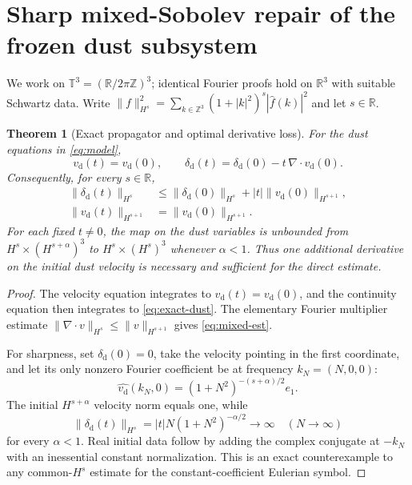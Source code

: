 \documentclass[11pt,a4paper]{article}
\newtheorem{theorem}{Theorem}
\newcommand{\T}{\mathbb T}
\newcommand{\R}{\mathbb R}
\newcommand{\Z}{\mathbb Z}
\begin{document}
\section{Sharp mixed-Sobolev repair of the frozen dust subsystem}
We work on $\T^3=(\R/2\pi\Z)^3$; identical
Fourier proofs hold on $\R^3$ with suitable
Schwartz data. Write
$\|f\|_{H^s}^2=\sum_{k\in\Z^3}
(1+|k|^2)^s|\widehat f(k)|^2$
and let $s\in\R$.

\begin{theorem}[Exact propagator and optimal derivative loss]
\label{thm:loss}
For the dust equations in \eqref{eq:model},
\begin{equation}\label{eq:exact-dust}
v_{\mathrm d}(t)=v_{\mathrm d}(0),\qquad
\delta_{\mathrm d}(t)=\delta_{\mathrm d}(0)
-t\,\nabla\cdot v_{\mathrm d}(0).
\end{equation}
Consequently, for every $s\in\R$,
\begin{equation}\label{eq:mixed-est}
\begin{aligned}
\|\delta_{\mathrm d}(t)\|_{H^s}
&\le \|\delta_{\mathrm d}(0)\|_{H^s}
+|t|\|v_{\mathrm d}(0)\|_{H^{s+1}},\\
\|v_{\mathrm d}(t)\|_{H^{s+1}}
&=\|v_{\mathrm d}(0)\|_{H^{s+1}}.
\end{aligned}
\end{equation}
For each fixed $t\ne0$, the map on the dust
variables is unbounded from
$H^s\times(H^{s+\alpha})^3$
to $H^s\times(H^s)^3$ whenever
$\alpha<1$. Thus one additional derivative
on the initial dust velocity is \emph{necessary
and sufficient} for the direct estimate.
\end{theorem}
\begin{proof}
The velocity equation integrates to
$v_{\mathrm d}(t)=v_{\mathrm d}(0)$,
and the continuity equation then integrates
to \eqref{eq:exact-dust}. The elementary
Fourier multiplier estimate
$\|\nabla\cdot v\|_{H^s}\le\|v\|_{H^{s+1}}$
gives \eqref{eq:mixed-est}.

For sharpness, set
$\delta_{\mathrm d}(0)=0$, take the
velocity pointing in the first coordinate,
and let its only nonzero Fourier coefficient
be at frequency $k_N=(N,0,0)$:
\[
\widehat{v_{\mathrm d}}(k_N,0)
=(1+N^2)^{-(s+\alpha)/2}e_1.
\]
The initial $H^{s+\alpha}$ velocity norm
equals one, while
\begin{equation}\label{eq:sharp}
\|\delta_{\mathrm d}(t)\|_{H^s}
=|t|N(1+N^2)^{-\alpha/2}
\longrightarrow\infty\quad (N\to\infty)
\end{equation}
for every $\alpha<1$.
Real initial data follow by adding the complex
conjugate at $-k_N$ with an inessential
constant normalization. This is an exact
counterexample to any common-$H^s$ estimate
for the constant-coefficient Eulerian symbol.
\end{proof}
\end{document}
